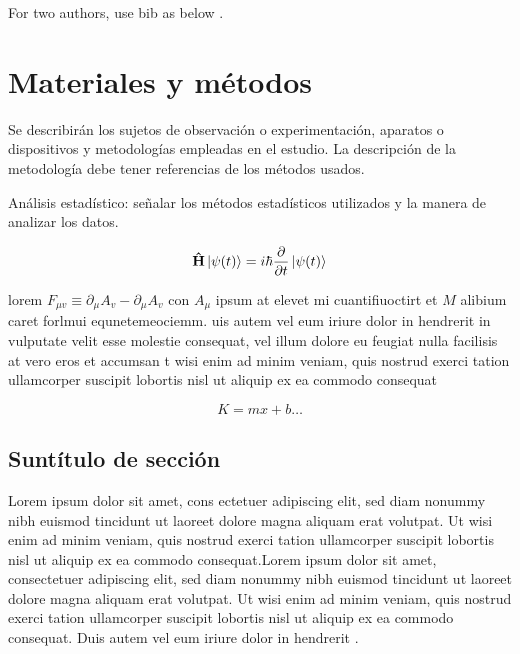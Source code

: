 \documentclass[9pt]{article}
\begin{document}
For two authors, use bib as below \citep{vergara2001referencias}.




\section*{Materiales y métodos}

Se describirán los sujetos de observación o experimentación, aparatos o dispositivos y metodologías empleadas en el estudio. La descripción de la metodología debe tener referencias de los métodos usados.

Análisis estadístico: señalar los métodos estadísticos utilizados  y la manera de analizar los datos.

\begin{equation}
    {\displaystyle \mathbf {\hat {H}} \left|\psi (t)\right\rangle =i\hbar {\partial  \over \partial t}\left|\psi (t)\right\rangle }
\end{equation}

lorem $F_{\mu v} \equiv \partial_{\mu}A_{v}-\partial_{\mu}A_{v}$ con $A_{\mu}$ ipsum at elevet mi cuantifiuoctirt et $M$ alibium caret forlmui equnetemeociemm. uis autem vel eum iriure dolor in hendrerit in vulputate velit esse molestie consequat, vel illum dolore eu feugiat nulla facilisis at vero eros et accumsan t wisi enim ad minim veniam, quis nostrud exerci tation ullamcorper suscipit lobortis nisl ut aliquip ex ea commodo consequat

\begin{equation}
    K = mx+b \dots
    \label{Eq:Nam}
\end{equation}

\subsection*{Suntítulo de sección}

Lorem ipsum dolor sit amet, cons ectetuer adipiscing elit, sed diam nonummy nibh euismod tincidunt ut laoreet dolore magna aliquam erat volutpat. Ut wisi enim ad minim veniam, quis nostrud exerci tation ullamcorper suscipit lobortis nisl ut aliquip ex ea commodo consequat.Lorem ipsum dolor sit amet, consectetuer adipiscing elit, sed diam nonummy nibh euismod tincidunt ut laoreet dolore magna aliquam erat volutpat. Ut wisi enim ad minim veniam, quis nostrud exerci tation ullamcorper suscipit lobortis nisl ut aliquip ex ea commodo consequat. Duis autem vel eum iriure dolor in hendrerit \parencite{desjardins2011comparative}.
\end{document}
